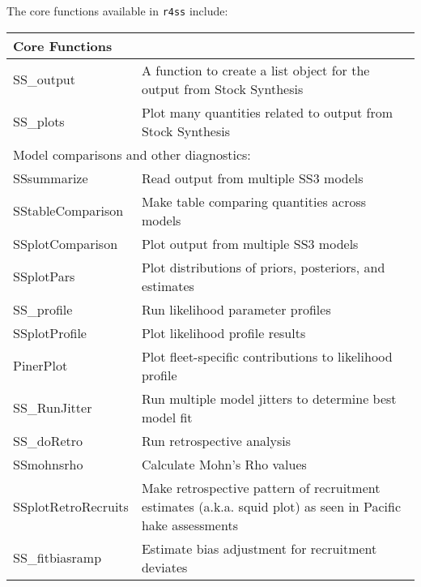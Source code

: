 The core functions available in \texttt{r4ss} include:
\begin{center}
	\begin{longtable}{p{4.5cm} p{10.52cm}}
		\hline
		Core Functions & \Tstrut\Bstrut\\
		\hline
		SS\_output \Tstrut& A function to create a list object for the output from Stock Synthesis\\
		SS\_plots  \Tstrut& Plot many quantities related to output from Stock Synthesis\\
		\hline
		
	
		\multicolumn{2}{l}{Model comparisons and other diagnostics:} \Tstrut\Bstrut\\
		\hline
		SSsummarize   \Tstrut & Read output from multiple SS3 models\\
		SStableComparison \Tstrut & Make table comparing quantities across models\\
		SSplotComparison \Tstrut & Plot output from multiple SS3 models \\
		SSplotPars    \Tstrut & Plot distributions of priors, posteriors, and estimates \\
		SS\_profile \Tstrut & Run likelihood parameter profiles \\
		SSplotProfile \Tstrut & Plot likelihood profile results \\
		PinerPlot     \Tstrut & Plot fleet-specific contributions to likelihood profile \\
		SS\_RunJitter \Tstrut & Run multiple model jitters to determine best model fit \\
		SS\_doRetro \Tstrut & Run retrospective analysis \\
		SSmohnsrho \Tstrut & Calculate Mohn's Rho values\\
		SSplotRetroRecruits \Tstrut & Make retrospective pattern of recruitment estimates (a.k.a. squid plot) as seen in Pacific hake assessments\Bstrut \\
		SS\_fitbiasramp \Tstrut& Estimate bias adjustment for recruitment deviates \Bstrut\\
		\hline
		

\end{longtable}
\end{center}
